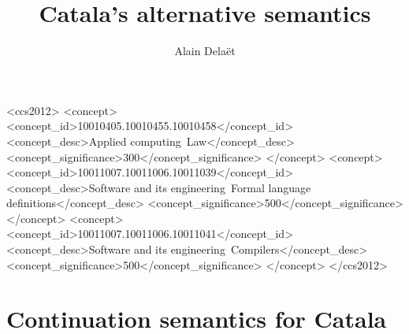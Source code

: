 \documentclass[english, references=cleveref]{programming}
\begin{document}
\title{Catala's alternative semantics}

\author[a]{Alain Delaët}




\begin{CCSXML}
  <ccs2012>
  <concept>
  <concept_id>10010405.10010455.10010458</concept_id>
  <concept_desc>Applied computing~Law</concept_desc>
  <concept_significance>300</concept_significance>
  </concept>
  <concept>
  <concept_id>10011007.10011006.10011039</concept_id>
  <concept_desc>Software and its engineering~Formal language definitions</concept_desc>
  <concept_significance>500</concept_significance>
  </concept>
  <concept>
  <concept_id>10011007.10011006.10011041</concept_id>
  <concept_desc>Software and its engineering~Compilers</concept_desc>
  <concept_significance>500</concept_significance>
  </concept>
  </ccs2012>
\end{CCSXML}






\section{Continuation semantics for Catala}
\end{document}
